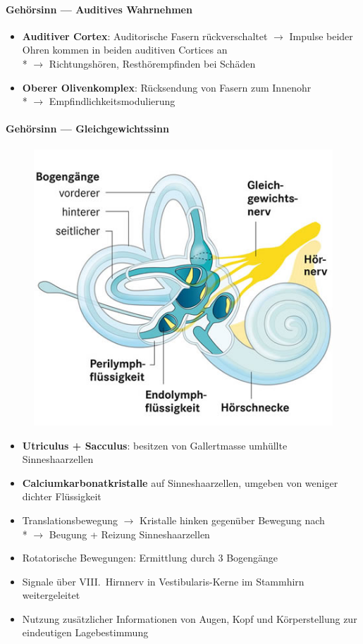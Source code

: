 \paragraph{Gehörsinn --- Auditives Wahrnehmen}
\begin{itemize}
  \item \textbf{Auditiver Cortex}: Auditorische Fasern rückverschaltet \( \to \) Impulse beider Ohren kommen in beiden auditiven Cortices an \\* \( \to \) Richtungshören, Resthörempfinden bei Schäden
  \item \textbf{Oberer Olivenkomplex}: Rücksendung von Fasern zum Innenohr \\* \( \to \) Empfindlichkeitsmodulierung
\end{itemize}

\paragraph{Gehörsinn --- Gleichgewichtssinn}
\begin{figure}[H]
  \centering
  \includegraphics[width=.4\linewidth]{assets/img/gleichgewichtsorgan.jpg}
\end{figure}
\begin{itemize}
  \item \textbf{Utriculus + Sacculus}: besitzen von Gallertmasse umhüllte Sinneshaarzellen
  \item \textbf{Calciumkarbonatkristalle} auf Sinneshaarzellen, umgeben von weniger dichter Flüssigkeit
  \item Translationsbewegung \( \to \) Kristalle hinken gegenüber Bewegung nach \\* \( \to \) Beugung + Reizung Sinneshaarzellen
  \item Rotatorische Bewegungen: Ermittlung durch 3 Bogengänge
  \item Signale über VIII.\ Hirnnerv in Vestibularis-Kerne im Stammhirn weitergeleitet
  \item Nutzung zusätzlicher Informationen von Augen, Kopf und Körperstellung zur eindeutigen Lagebestimmung
\end{itemize}